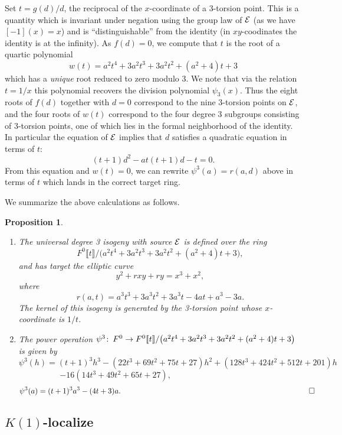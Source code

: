 \documentclass{gtpart}
\newtheorem{prop}[thm]{Proposition}
\theoremstyle{definition}
\theoremstyle{remark}
\def\co{\colon\thinspace}
\begin{document}
Set $t = g(d)/d$, the reciprocal of the $x$-coordinate of a 3-torsion point.  
This is a quantity which is invariant under negation using the group law of 
$\cal E$ (as we have $[-1](x) = x$) and is ``distinguishable'' from the 
identity (in $xy$-coodinates the identity is at the infinity).  As $f(d) = 0$, 
we compute that $t$ is the root of a quartic polynomial 
\[
 w(t) = a^2 t^4 + 3 a^2 t^3 + 3 a^2 t^2 + (a^2 + 4) t + 3 
\]
which has a {\em unique} root reduced to zero modulo 3.  We note that via the 
relation $t = 1/x$ this polynomial recovers the division polynomial 
$\psi_3(x)$.  Thus the eight roots of $f(d)$ together with $d = 0$ correspond 
to the nine 3-torsion points on $\cal E$, and the four roots of $w(t)$ 
correspond to the four degree 3 subgroups consisting of 3-torsion points, one 
of which lies in the formal neighborhood of the identity.  In particular the 
equation of $\cal E$ implies that $d$ satisfies a quadratic equation in terms 
of $t$: 
\[
 (t + 1) d^2 - a t (t + 1) d - t = 0.  
\]
From this equation and $w(t) = 0$, we can rewrite $\psi^3(a) = r(a,d)$ above 
in terms of $t$ which lands in the correct target ring.  

We summarize the above calculations as follows.  
\begin{prop}
\label{prop}
 \mbox{}
 \begin{enumerate}
  \item The universal degree 3 isogeny with source $\cal E$ is defined over 
  the ring 
  \[
   F^0 \llbracket t \rrbracket / 
   \big(a^2 t^4 + 3 a^2 t^3 + 3 a^2 t^2 + (a^2 + 4) t + 3\big), 
  \]
  and has target the elliptic curve 
  \[
   y^2 + r x y + r y = x^3 + x^2, 
  \]
  where 
  \[
   r(a,t) = a^3 t^3 + 3 a^3 t^2 + 3 a^3 t - 4 a t + a^3 - 3 a.  
  \]
  The kernel of this isogeny is generated by the 3-torsion point whose 
  $x$-coordinate is $1/t$.  
  \item The power operation $\psi^3\co F^0  \to F^0 \llbracket t \rrbracket / 
  \big(a^2 t^4 + 3 a^2 t^3 + 3 a^2 t^2 + (a^2 + 4) t + 3\big)$ is given by 
  \[
   \psi^3(h) = (t + 1)^3 h^3 - (22 t^3 + 69 t^2 + 75 t + 27) h^2 + (128 t^3 + 
   424 t^2 + 512 t + 201) h 
  \]
  \[
   - 16 (14 t^3 + 49 t^2 + 65 t + 27), 
   ~~~~~~~~~~~~~~~~~~~~~~~~~~~~~~~~~~~~~~~~~~~~~~~~~ 
  \]
  \[
   \psi^3(a) = (t + 1)^3 a^3 - (4 t + 3) a.  
   ~~~~~~~~~~~~~~~~~~~~~~~~~~~~~~~~~~~~~~~~~~~~~~~~~~~~~~~~~~~~~~~~~~~~~ \qed
  \]
 \end{enumerate}
\end{prop}


\subsection{$K(1)$-localize}
\label{subsec:step3}
\end{document}
